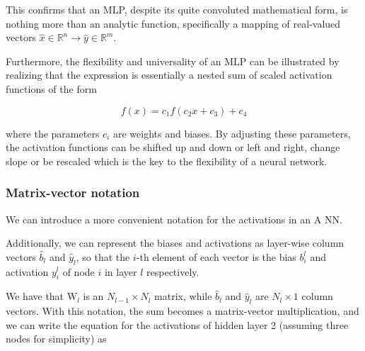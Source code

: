 \documentclass[11pt]{article}
\begin{document}
This confirms that an MLP, despite its quite convoluted mathematical
form, is nothing more than an analytic function, specifically a mapping
of real-valued vectors
\(\hat{x} \in \mathbb{R}^n \rightarrow \hat{y} \in \mathbb{R}^m\).

Furthermore, the flexibility and universality of an MLP can be
illustrated by realizing that the expression is essentially a nested sum
of scaled activation functions of the form

    \hypertarget{_auto5}{}

\[
\begin{equation}
 f(x) = c_1 f(c_2 x + c_3) + c_4
\label{_auto5} \tag{10}
\end{equation}
\]

    where the parameters \(c_i\) are weights and biases. By adjusting these
parameters, the activation functions can be shifted up and down or left
and right, change slope or be rescaled which is the key to the
flexibility of a neural network.

\hypertarget{matrix-vector-notation}{%
\subsubsection{Matrix-vector notation}\label{matrix-vector-notation}}

We can introduce a more convenient notation for the activations in an A
NN.

Additionally, we can represent the biases and activations as layer-wise
column vectors \(\hat{b}_l\) and \(\hat{y}_l\), so that the \(i\)-th
element of each vector is the bias \(b_i^l\) and activation \(y_i^l\) of
node \(i\) in layer \(l\) respectively.

We have that \(\mathrm{W}_l\) is an \(N_{l-1} \times N_l\) matrix, while
\(\hat{b}_l\) and \(\hat{y}_l\) are \(N_l \times 1\) column vectors.
With this notation, the sum becomes a matrix-vector multiplication, and
we can write the equation for the activations of hidden layer 2
(assuming three nodes for simplicity) as

    \hypertarget{_auto6}{}
\end{document}
